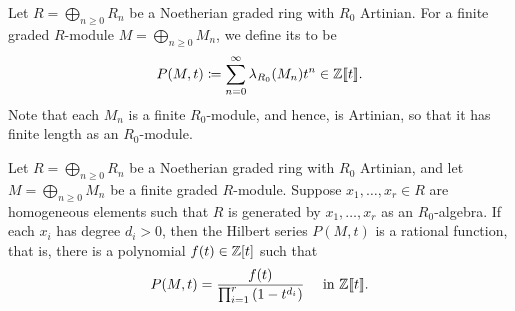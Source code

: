\begin{definition}
    Let $R = \displaystyle\bigoplus_{n\ge 0} R_n$ be a Noetherian graded ring with $R_0$ Artinian. For a finite graded $R$-module $M = \displaystyle\bigoplus_{n\ge 0} M_n$, we define its  to be 
    \begin{equation*}
        P(M, t)\coloneq \sum_{n = 0}^\infty\lambda_{R_0}(M_n) t^n\in\mathbb{Z}\llbracket t\rrbracket.
    \end{equation*}
    Note that each $M_n$ is a finite $R_0$-module, and hence, is Artinian, so that it has finite length as an $R_0$-module.
\end{definition}

\begin{theorem}
    Let $R = \displaystyle\bigoplus_{n\ge 0} R_n$ be a Noetherian graded ring with $R_0$ Artinian, and let $M =\displaystyle\bigoplus_{n\ge 0} M_n$ be a finite graded $R$-module. Suppose $x_1,\dots,x_r\in R$ are homogeneous elements such that $R$ is generated by $x_1,\dots,x_r$ as an $R_0$-algebra. If each $x_i$ has degree $d_i > 0$, then the Hilbert series $P(M, t)$ is a rational function, that is, there is a polynomial $f(t)\in\mathbb{Z}[t]$ such that 
    \begin{equation*}
        P(M, t) = \frac{f(t)}{\prod_{i = 1}^r \left(1 - t^{d_i}\right)}\quad\text{ in } \mathbb{Z}\llbracket t\rrbracket.
    \end{equation*}
\end{theorem}
